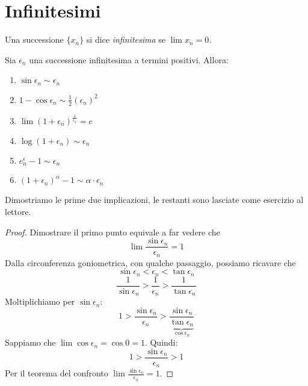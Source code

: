 \section{Infinitesimi}

\begin{definition}
Una successione $\{x_n\}$ si dice \emph{infinitesima} se $\lim x_n = 0$.
\end{definition}

\begin{proposition}
Sia $\epsilon_n$ una successione infinitesima a termini positivi. Allora:
\begin{enumerate}
\item $\sin \epsilon_n \sim \epsilon_n$
\item $1 - \cos \epsilon_n \sim \frac{1}{2} (\epsilon_n)^2$
\item $\lim (1+\epsilon_n)^\frac{1}{\epsilon_n} = e$
\item $\log (1 + \epsilon_n) \sim \epsilon_n$
\item $e^\epsilon_n - 1 \sim \epsilon_n$
\item $(1+\epsilon_n)^\alpha - 1 \sim \alpha \cdot \epsilon_n$
\end{enumerate}
\end{proposition}

Dimostriamo le prime due implicazioni, le restanti sono lasciate come esercizio al lettore.

\begin{proof}
Dimostrare il primo punto equivale a far vedere che
\begin{equation*}
\lim \frac{\sin \epsilon_n}{\epsilon_n} = 1
\end{equation*}
Dalla circonferenza goniometrica, con qualche passaggio, possiamo ricavare che
\begin{equation*}
\sin \epsilon_n < \epsilon_n < \tan \epsilon_n
\end{equation*}
\begin{equation*}
\frac{1}{\sin \epsilon_n} > \frac{1}{\epsilon_n} > \frac{1}{\tan \epsilon_n}
\end{equation*}
Moltiplichiamo per $\sin \epsilon_n$:
\begin{equation*}
1 > \frac{\sin \epsilon_n}{\epsilon_n} > \underbrace{\frac{\sin \epsilon_n}{\tan \epsilon_n}}_{\cos \epsilon_n}
\end{equation*}
Sappiamo che $\lim \cos \epsilon_n = \cos 0 = 1$. Quindi:
\begin{equation*}
1 > \frac{\sin \epsilon_n}{\epsilon_n} > 1
\end{equation*}
Per il teorema del confronto $\lim \frac{\sin \epsilon_n}{\epsilon_n} = 1$.
\end{proof}

